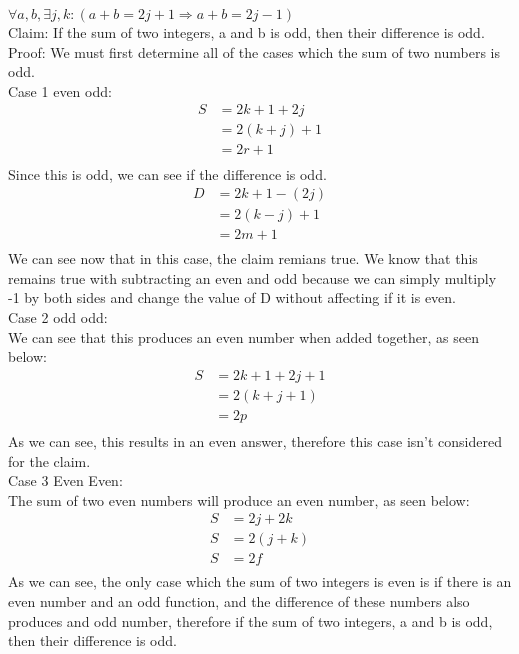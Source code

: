 \documentclass{letter}
\theoremstyle{definition}
\begin{document}
\begin{description}
\begin{enumerate}
$\forall a,b, \exists j,k:(a+b=2j+1 \Rightarrow a+b=2j-1)$ \\
Claim: If the sum of two integers, a and b is odd, then their difference is odd. \\
Proof: We must first determine all of the cases which the sum of two numbers is odd.\\
Case 1 even odd: \\
\begin{align*}
S &= 2k+1+2j \\
&= 2(k+j)+1 \tag{Factored out two} \\
&= 2r+1 \tag{Set r=k+j} \\
\end{align*}
Since this is odd, we can see if the difference is odd. \\
\begin{align*}
D &= 2k+1-(2j) \\
&= 2(k-j)+1 \tag{Factor out 2} \\
&= 2m+1 \tag{Set k-j equal to m} \\
\end{align*} 
We can see now that in this case, the claim remians true. We know that this remains true with subtracting an even and odd because we can simply multiply -1 by both sides and change the value of D without affecting if it is even. \\
Case 2 odd odd: \\
We can see that this produces an even number when added together, as seen below: \\
\begin{align*}
S &= 2k+1+2j+1 \\
&=2(k+j+1) \tag{Factored out the 2}\\
&= 2p \tag{set p as k+j+1} \\
\end{align*}
As we can see, this results in an even answer, therefore this case isn't considered for the claim. \\
Case 3 Even Even: \\
The sum of two even numbers will produce an even number, as seen below:
\begin{align*}
S &= 2j+2k \\
S &= 2(j+k) \tag{Factored out 2} \\
S &= 2f \tag{Set f equal to j+k} \\
\end{align*}
As we can see, the only case which the sum of two integers is even is if there is an even number and an odd function, and the difference of these numbers also produces and odd number, therefore if the sum of two integers, a and b is odd, then their difference is odd.







\end{enumerate}
\end{description}
\end{document}
